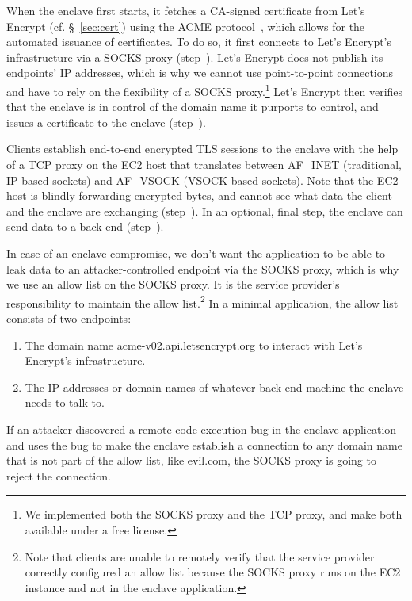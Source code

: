 When the enclave first starts, it fetches a CA-signed certificate from Let's
Encrypt (cf. \S~\ref{sec:cert}) using the ACME protocol~\cite{acme-protocol},
which allows for the automated issuance of certificates.  To do so, it first
connects to Let's Encrypt's infrastructure via a SOCKS proxy (step~).
Let's Encrypt does not publish its endpoints' IP addresses, which is why we
cannot use point-to-point connections and have to rely on the flexibility of a
SOCKS proxy.\footnote{We implemented both the SOCKS proxy and the TCP proxy, and
make both available under a free license.}  Let's Encrypt then verifies that the
enclave is in control of the domain name it purports to control, and issues a
certificate to the enclave (step~).

Clients establish end-to-end encrypted TLS sessions to the enclave with the help
of a TCP proxy on the EC2 host that translates between AF\_INET (traditional,
IP-based sockets) and AF\_VSOCK (VSOCK-based sockets).  Note that the EC2 host
is blindly forwarding encrypted bytes, and cannot see what data the client and
the enclave are exchanging (step~).  In an optional, final step, the
enclave can send data to a back end (step~).

In case of an enclave compromise, we don't want the application to be able to
leak data to an attacker-controlled endpoint via the SOCKS proxy, which is why
we use an allow list on the SOCKS proxy.  It is the service provider's
responsibility to maintain the allow list.\footnote{Note that clients are unable
to remotely verify that the service provider correctly configured an allow list
because the SOCKS proxy runs on the EC2 instance and not in the enclave
application.}  In a minimal application, the allow list consists of two
endpoints:

\begin{enumerate}
    \item The domain name acme-v02.api.letsencrypt.org to interact with Let's
      Encrypt's infrastructure.
    \item The IP addresses or domain names of whatever back end machine the
      enclave needs to talk to.
\end{enumerate}

If an attacker discovered a remote code execution bug in the enclave application
and uses the bug to make the enclave establish a connection to any domain name
that is not part of the allow list, like evil.com, the SOCKS proxy is going to
reject the connection.

